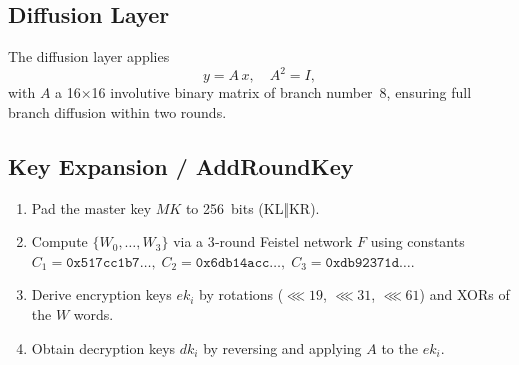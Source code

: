 \documentclass[11pt,a4paper]{report}
\begin{document}
\subsection{Diffusion Layer}
The diffusion layer applies
\[
y = A\,x,\quad A^2 = I,
\]
with \(A\) a 16×16 involutive binary matrix of branch number 8, ensuring full branch diffusion within two rounds.

\subsection{Key Expansion / AddRoundKey}
\begin{enumerate}
	\item Pad the master key \(MK\) to 256 bits (KL‖KR).
	\item Compute \(\{W_0,\dots,W_3\}\) via a 3‑round Feistel network \(F\) using constants 
	\(\displaystyle C_1=\texttt{0x517cc1b7…},\;C_2=\texttt{0x6db14acc…},\;C_3=\texttt{0xdb92371d…}\).
	\item Derive encryption keys \(\mathit{ek}_i\) by rotations ($\lll 19$, $\lll 31$, $\lll 61$) and XORs of the \(W\) words.
	\item Obtain decryption keys \(\mathit{dk}_i\) by reversing and applying \(A\) to the \(\mathit{ek}_i\).
\end{enumerate}

%
%
%

	
\end{document}
